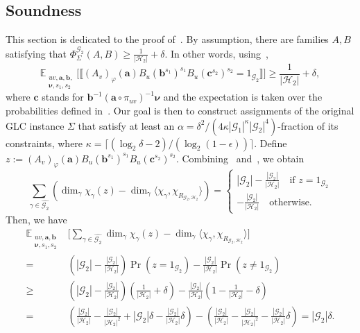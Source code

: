 \documentclass[a4paper,11pt]{article}
\theoremstyle{definition}
\newcommand{\tuple}[1]{{\mathbf{#1}}}
\newcommand{\ex}[1]{\mathbb{E}_{#1}}
\newcommand{\gr}{\mathscr{G}}
\newcommand{\sgr}{\mathscr{H}}
\newcommand{\ba}{\mathbf{a}}
\newcommand{\bb}{\mathbf{b}}
\newcommand{\bc}{\mathbf{c}}
\newcommand{\groupid}{1}
\begin{document}
\subsection{Soundness}
\label{sec:soundness}

This section is dedicated to the proof of~. By assumption, there are families $A, B$
satisfying that
$\Phi_\Sigma^{\gr_2}(A,B)  \geq \frac{1}{|\sgr_2|} + \delta$. In other words, using~,
\[
\ex{\substack{uv, \tuple{a},\tuple{b}, \\ \bm{\nu},s_1,s_2}} \Big[ 
\llbracket (A_v)_{\varphi}(\tuple{a}) B_u(\tuple{b}^{s_1})^{s_1} B_u(\tuple{c}^{s_2})^{s_2}    = \groupid_{\gr_2} \rrbracket 
\Big]  \geq \frac{1}{|\sgr_2|} + \delta,
\]
where $\tuple{c}$ stands for
$\tuple{b}^{-1} (\tuple{a} \circ \pi_{uv})^{-1}\bm{\nu}$ and the expectation is taken over the probabilities defined in~.
Our goal is then to construct assignments of the original GLC instance $\Sigma$ that satisfy at least an $\alpha=\delta^2/(4\kappa|\gr_1|^\kappa|\gr_2|^{4})$-fraction of its constraints, where $\kappa=\lceil(\log_2\delta -2)/(\log_2(1-\epsilon))\rceil$.
Define $z:= (A_v)_{\varphi}(\ba)B_u(\bb^{s_1})^{s_1}B_u(\bc^{s_2})^{s_2}$.  Combining~ and~, we obtain 
\[ \sum_{\gamma \in \widehat{\gr_2}} \left(\dim_\gamma \chi_{\gamma}(z) - \dim_\gamma \langle \chi_\gamma, \chi_{R_{\gr_2,\sgr_2}} \rangle \right) =\begin{cases}
    |\gr_2| - \frac{|\gr_2|}{|\sgr_2|}  \quad \text{if } z=\groupid_{\gr_2}\\
    - \frac{|\gr_2|}{|\sgr_2|} \quad \text{otherwise.}
\end{cases}\]
Then, we have 
\begin{align*}
 \ex{\substack{uv, \tuple{a},\tuple{b}\\ \bm{\nu},s_1,s_2}}   &
\Big[ 
\sum_{\gamma \in \widehat{\gr_2}} \dim_\gamma \chi_{\gamma}(z) - 
\dim_\gamma \langle \chi_\gamma, \chi_{R_{\gr_2,\sgr_2}} \rangle \Big] \\ = &
\left(|\gr_2| - \frac{|\gr_2|}{|\sgr_2|}\right)
\Pr\left( z = 1_{\gr_2}\right)
- \frac{|\gr_2|}{|\sgr_2|} 
\Pr\left( z \neq 1_{\gr_2}\right)  \\  \geq &
\left(|\gr_2| - \frac{|\gr_2|}{|\sgr_2|}\right) \left( \frac{1}{|\sgr_2|} +\delta \right)
- \frac{|\gr_2|}{|\sgr_2|} 
\left( 1 -  \frac{1}{|\sgr_2|} -\delta \right) \\  = &
\left(
\frac{|\gr_2|}{|\sgr_2|} -
\frac{|\gr_2|}{|\sgr_2|^2} +
|\gr_2|\delta -
\frac{|\gr_2|}{|\sgr_2|} \delta
\right)
-
\left(
\frac{|\gr_2|}{|\sgr_2|} -
\frac{|\gr_2|}{|\sgr_2|^2} -
\frac{|\gr_2|}{|\sgr_2|} \delta
\right) =  
|\gr_2|\delta.
\end{align*}
\end{document}
